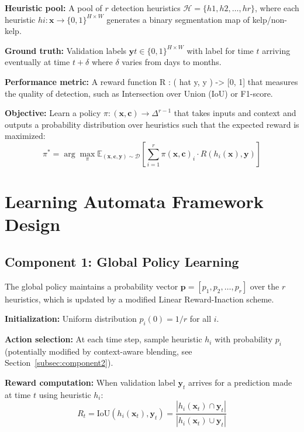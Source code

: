 \documentclass[12pt,oneside]{book}
\begin{document}
\textbf{Heuristic pool:} A pool of $r$ detection heuristics $\mathcal{H} = \{h1, h2, \ldots, hr\}$, where each heuristic $hi: \mathbf{x} \rightarrow \{0, 1\}^{H \times W}$ generates a binary segmentation map of kelp/non-kelp.

\textbf{Ground truth:} Validation labels $\mathbf{y}t \in \{0, 1\}^{H \times W}$ with label for time $t$ arriving eventually at time $t + \delta$ where $\delta$ varies from days to months.

\textbf{Performance metric:} A reward function R : ( hat {y}, y ) -> [0, 1] that measures the quality of detection, such as Intersection over Union (IoU) or F1-score.

\textbf{Objective:} Learn a policy $\pi:(\mathbf{x}, \mathbf{c})\to\Delta^{r-1}$ that takes inputs and context and outputs a probability distribution over heuristics such that the expected reward is maximized:
\begin{equation}
    \pi^* = \arg\max_\pi \mathbb{E}_{(\mathbf{x}, \mathbf{c}, \mathbf{y}) \sim \mathcal{D}} \left[ \sum_{i=1}^{r} \pi(\mathbf{x}, \mathbf{c})_i \cdot R(h_i(\mathbf{x}), \mathbf{y}) \right]
\end{equation}

\section{Learning Automata Framework Design}
\label{sec:la-framework}

\subsection{Component 1: Global Policy Learning}
\label{subsec:component1}

The global policy maintains a probability vector $\mathbf{p} = [p_1, p_2, \ldots, p_r]$ over the $r$ heuristics, which is updated by a modified Linear Reward-Inaction scheme.

\textbf{Initialization:} Uniform distribution $p_i(0) = 1/r$ for all $i$.

\textbf{Action selection:} At each time step, sample heuristic $h_i$ with probability $p_i$ (potentially modified by context-aware blending, see Section~\ref{subsec:component2}).

\textbf{Reward computation:} When validation label $\mathbf{y}_t$ arrives for a prediction made at time $t$ using heuristic $h_i$:
\begin{equation}
    R_t = \text{IoU}(h_i(\mathbf{x}_t), \mathbf{y}_t) = \frac{|h_i(\mathbf{x}_t) \cap \mathbf{y}_t|}{|h_i(\mathbf{x}_t) \cup \mathbf{y}_t|}
\end{equation}
\end{document}
